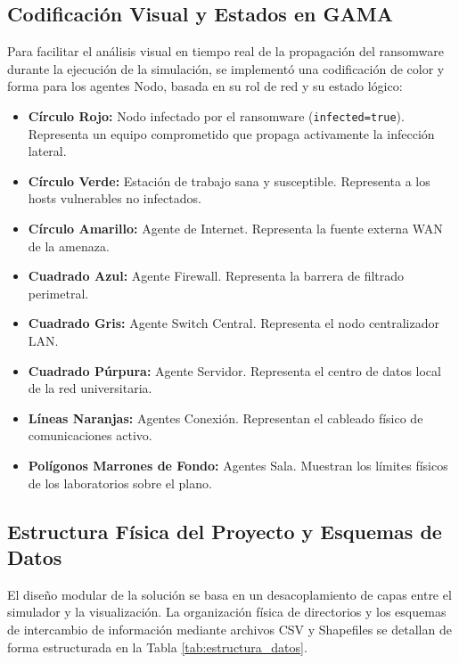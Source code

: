\subsection{Codificación Visual y Estados en GAMA}
Para facilitar el análisis visual en tiempo real de la propagación del ransomware durante la ejecución de la simulación, se implementó una codificación de color y forma para los agentes Nodo, basada en su rol de red y su estado lógico:
\begin{itemize}
    \item \textbf{Círculo Rojo:} Nodo infectado por el ransomware (\texttt{infected}\allowbreak\texttt{=}\allowbreak\texttt{true}). Representa un equipo comprometido que propaga activamente la infección lateral.
    \item \textbf{Círculo Verde:} Estación de trabajo sana y susceptible. Representa a los hosts vulnerables no infectados.
    \item \textbf{Círculo Amarillo:} Agente de Internet. Representa la fuente externa WAN de la amenaza.
    \item \textbf{Cuadrado Azul:} Agente Firewall. Representa la barrera de filtrado perimetral.
    \item \textbf{Cuadrado Gris:} Agente Switch Central. Representa el nodo centralizador LAN.
    \item \textbf{Cuadrado Púrpura:} Agente Servidor. Representa el centro de datos local de la red universitaria.
    \item \textbf{Líneas Naranjas:} Agentes Conexión. Representan el cableado físico de comunicaciones activo.
    \item \textbf{Polígonos Marrones de Fondo:} Agentes Sala. Muestran los límites físicos de los laboratorios sobre el plano.
\end{itemize}

\subsection{Estructura Física del Proyecto y Esquemas de Datos}
El diseño modular de la solución se basa en un desacoplamiento de capas entre el simulador y la visualización. La organización física de directorios y los esquemas de intercambio de información mediante archivos CSV y Shapefiles se detallan de forma estructurada en la Tabla \ref{tab:estructura_datos}.

